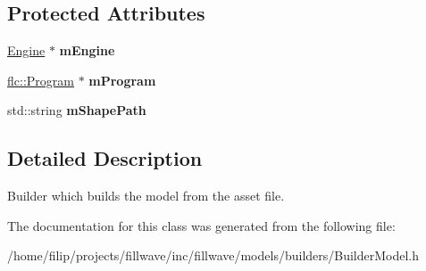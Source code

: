 \subsection*{Protected Attributes}
\begin{DoxyCompactItemize}
\item 
\mbox{\label{classflw_1_1flf_1_1BuilderModel_a625e6c302b14ff9775e9ffe3a72b36cb}} 
\hyperlink{classflw_1_1Engine}{Engine} $\ast$ {\bfseries m\+Engine}
\item 
\mbox{\label{classflw_1_1flf_1_1BuilderModel_a1ff36d61e2f4ae3e8778293285516a57}} 
\hyperlink{classflw_1_1flc_1_1Program}{flc\+::\+Program} $\ast$ {\bfseries m\+Program}
\item 
\mbox{\label{classflw_1_1flf_1_1BuilderModel_ae4afbfefc5abc67be6d88a85dc285df7}} 
std\+::string {\bfseries m\+Shape\+Path}
\end{DoxyCompactItemize}


\subsection{Detailed Description}
Builder which builds the model from the asset file. 

The documentation for this class was generated from the following file\+:\begin{DoxyCompactItemize}
\item 
/home/filip/projects/fillwave/inc/fillwave/models/builders/Builder\+Model.\+h\end{DoxyCompactItemize}
